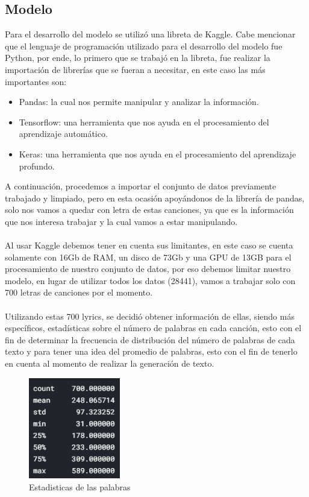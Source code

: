 \subsection{Modelo}
Para el desarrollo del modelo se utilizó una libreta de Kaggle. Cabe mencionar que el lenguaje de programación utilizado para el desarrollo del modelo fue Python, por ende, lo primero que se trabajó en la libreta, fue realizar la importación de librerías que se fueran a necesitar, en este caso las más importantes son:
\begin{itemize}
	\item Pandas: la cual nos permite manipular y analizar la información.
	\item Tensorflow: una herramienta que nos ayuda en el procesamiento del aprendizaje automático.
	\item Keras: una herramienta que nos ayuda en el procesamiento del aprendizaje profundo.
\end{itemize}
A continuación, procedemos a importar el conjunto de datos previamente trabajado y limpiado, pero en esta ocasión apoyándonos de la librería de pandas, solo nos vamos a quedar con letra de estas canciones, ya que es la información que nos interesa trabajar y la cual vamos a estar manipulando.\\\\
Al usar Kaggle debemos tener en cuenta sus limitantes, en este caso se cuenta solamente con 16Gb de RAM, un disco de 73Gb y una GPU de 13GB para el procesamiento de nuestro conjunto de datos, por eso debemos limitar nuestro modelo, en lugar de utilizar todos los datos (28441), vamos a trabajar solo con 700 letras de canciones por el momento.\\\\ 
Utilizando estas 700 lyrics, se decidió obtener información de ellas, siendo más específicos, estadísticas sobre el número de palabras en cada canción, esto con el fin de determinar la frecuencia de distribución del número de palabras de cada texto y para tener una idea del promedio de palabras, esto con el fin de tenerlo en cuenta al momento de realizar la generación de texto.
\begin{figure}[h]
	\centering
	\includegraphics[width=4cm]{figuras/estadistica.png}
	\caption{Estadisticas de las palabras}
	\label{fig:Estadisticas_de_las_palabras}
\end{figure}
